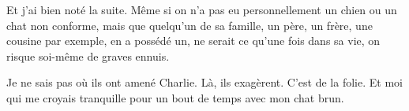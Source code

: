 Et j'ai bien noté la suite. Même si on n'a pas eu personnellement un chien ou un chat non conforme, mais que quelqu'un de sa famille, un père, un frère, une cousine par exemple, en a possédé un, ne serait ce qu'une fois dans sa vie, on risque soi-même de graves ennuis.

Je ne sais pas où ils ont amené Charlie. Là, ils exagèrent. C'est de la folie. Et moi qui me croyais tranquille pour un bout de temps avec mon chat brun.
